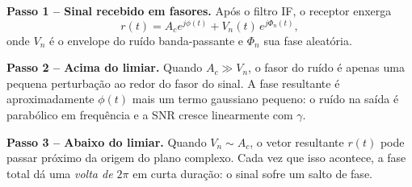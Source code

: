 \documentclass[11pt,a4paper]{article}
\begin{document}
\begin{resolucao}

\textbf{Passo 1 -- Sinal recebido em fasores.} Após o filtro IF, o receptor enxerga
\[
  r(t) = A_c e^{j\phi(t)} + V_n(t)\,e^{j\Phi_n(t)},
\]
onde $V_n$ é o envelope do ruído banda-passante e $\Phi_n$ sua fase aleatória.

\textbf{Passo 2 -- Acima do limiar.} Quando $A_c \gg V_n$, o fasor do ruído é apenas uma pequena perturbação ao redor do fasor do sinal. A fase resultante é aproximadamente $\phi(t)$ mais um termo gaussiano pequeno: o ruído na saída é parabólico em frequência e a SNR cresce linearmente com $\gamma$.

\begin{center}
\end{center}

\textbf{Passo 3 -- Abaixo do limiar.} Quando $V_n \sim A_c$, o vetor resultante $r(t)$ pode passar próximo da origem do plano complexo. Cada vez que isso acontece, a fase total dá uma \emph{volta de $2\pi$} em curta duração: o sinal sofre um salto de fase.


\end{resolucao}
\end{document}
